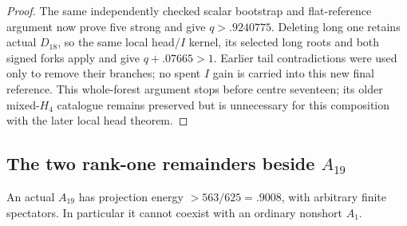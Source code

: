 \begin{proof}
The same independently checked scalar bootstrap and flat-reference
argument now prove five strong and give $q>.9240775$.
Deleting long one retains actual $D_{18}$, so the same local head/$I$
kernel, its selected long roots and both signed forks apply and give
$q+.07665>1$. Earlier tail contradictions were used only to remove
their branches; no spent $I$ gain is carried into this new final
reference. This whole-forest argument stops before centre seventeen;
its older mixed-$H_4$ catalogue remains preserved but is unnecessary
for this composition with the later local head theorem.
\end{proof}

\subsection{The two rank-one remainders beside $A_{19}$}
\label{app:tail:A19rankone}
\begin{lemma}
\label{app:tail:lem:A19ordinary}
An actual $A_{19}$ has projection energy $>563/625=.9008$,
with arbitrary finite spectators. In particular it cannot coexist
with an ordinary nonshort $A_1$.
\end{lemma}
